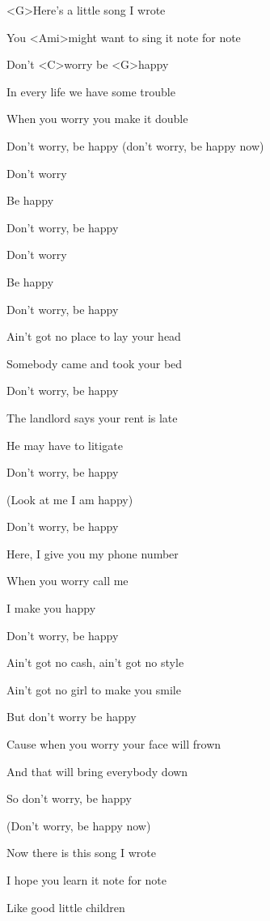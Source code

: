 

\zs
<G>Here's a little song I wrote 

You <Ami>might want to sing it note for note 

Don't <C>worry be <G>happy

In every life we have some trouble

When you worry you make it double 

Don't worry, be happy (don't worry, be happy now)
\ks

\zr
Don't worry 

Be happy

Don't worry, be happy

Don't worry

Be happy

Don't worry, be happy
\kr

\zs
Ain't got no place to lay your head 

Somebody came and took your bed

Don't worry, be happy 

The landlord says your rent is late 

He may have to litigate 

Don't worry, be happy 

(Look at me I am happy)
\ks

\zr
Don't worry, be happy 

Here, I give you my phone number 

When you worry call me

I make you happy 

Don't worry, be happy 
\kr

\zs
Ain't got no cash, ain't got no style 

Ain't got no girl to make you smile 

But don't worry be happy

Cause when you worry your face will frown 

And that will bring everybody down 

So don't worry, be happy 

(Don't worry, be happy now)
\ks

\zr
\kr

\zs
Now there is this song I wrote 

I hope you learn it note for note 

Like good little children 


